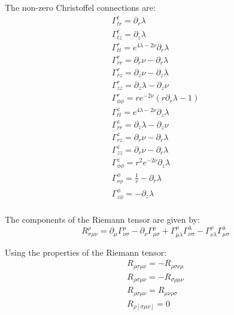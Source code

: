 \documentclass{article}
\begin{document}
The non-zero Christoffel connections are:
\begin{equation}
\begin{array}{l}
\Gamma^{t}_{tr}=\partial_{r}\lambda\\
\Gamma^{t}_{tz}=\partial_{z}\lambda\\
\Gamma^{r}_{tt}=e^{4\lambda-2\nu}\partial_{r}\lambda\\
\Gamma^{r}_{rr}=\partial_{r}\nu-\partial_{r}\lambda\\
\Gamma^{r}_{rz}=\partial_{z}\nu-\partial_{z}\lambda\\
\Gamma^{r}_{zz}=\partial_{z}\lambda-\partial_{z}\nu\\
\Gamma^{r}_{\phi\phi}=re^{-2\nu}\left(r\partial_{r}\lambda-1\right)\\
\Gamma^{z}_{tt}=e^{4\lambda-2\nu}\partial_{z}\lambda\\
\Gamma^{z}_{rr}=\partial_{z}\lambda-\partial_{z}\nu\\
\Gamma^{z}_{rz}=\partial_{r}\nu-\partial_{r}\lambda\\ 
\Gamma^{z}_{zz}=\partial_{r}\nu-\partial_{r}\lambda\\
\Gamma^{z}_{\phi\phi}=r^{2}e^{-2\nu}\partial_{z}\lambda\\
\Gamma^{\phi}_{r\phi}=\frac{1}{r}-\partial_{r}\lambda\\
\Gamma^{\phi}_{z\phi}=-\partial_{z}\lambda\\
\end{array}
\end{equation}

The components of the Riemann tensor are given by:
\begin{equation}
R_{\sigma\mu\nu}^{\rho}=\partial_{\mu}\Gamma_{\nu\sigma}^{\rho}-\partial_{\nu}\Gamma_{\mu\sigma}^{\rho}+\Gamma_{\mu\lambda}^{\rho}\Gamma_{\nu\sigma}^{\lambda}-\Gamma_{\nu\lambda}^{\rho}\Gamma_{\mu\sigma}^{\lambda}
\end{equation}

Using the properties of the Riemann tensor:
\begin{equation}
\begin{array}{l}
R_{\rho\sigma\mu\nu}=-R_{\rho\sigma\nu\mu}\\
R_{\rho\sigma\mu\nu}=-R_{\sigma\rho\mu\nu}\\
R_{\rho\sigma\mu\nu}=R_{\mu\nu\rho\sigma}\\
R_{\rho[\sigma\mu\nu]}=0\\
\end{array}
\end{equation}
\end{document}
